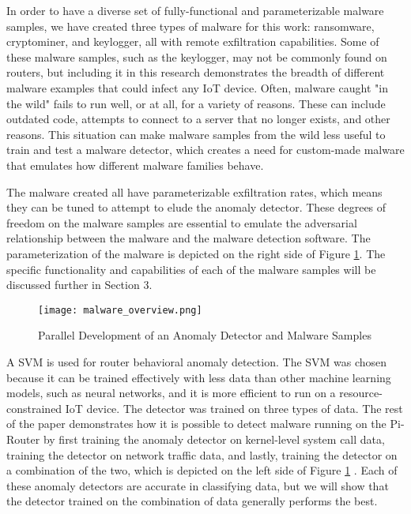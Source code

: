 \documentclass[runningheads]{llncs}
\begin{document}
\indent In order to have a diverse set of fully-functional and parameterizable malware samples, we have created three types of malware for this work: ransomware, cryptominer, and keylogger, all with remote exfiltration capabilities. Some of these malware samples, such as the keylogger, may not be commonly found on routers, but including it in this research demonstrates the breadth of different malware examples that could infect any IoT device. Often, malware caught "in the wild" fails to run well, or at all, for a variety of reasons. These can include outdated code, attempts to connect to a server that no longer exists, and other reasons. This situation can make malware samples from the wild less useful to train and test a malware detector, which creates a need for custom-made malware that emulates how different malware families behave.

\indent The malware created all have parameterizable exfiltration rates, which means they can be tuned to attempt to elude the anomaly detector. These degrees of freedom on the malware samples are essential to emulate the adversarial relationship between the malware and the malware detection software. The parameterization of the malware is depicted on the right side of Figure \ref{fig:overview}. The specific functionality and capabilities of each of the malware samples will be discussed further in Section 3.

\begin{figure}
    \centering
    \texttt{[image: malware\_overview.png]}
    \caption{Parallel Development of an Anomaly Detector and Malware Samples\label{fig:overview}}
\end{figure}

\indent A SVM is used for router behavioral anomaly detection. The SVM was chosen because it can be trained effectively with less data than other machine learning models, such as neural networks, and it is more efficient to run on a resource-constrained IoT device. The detector was trained on three types of data. The rest of the paper demonstrates how it is possible to detect malware running on the Pi-Router by first training the anomaly detector on kernel-level system call data, training the detector on network traffic data, and lastly, training the detector on a combination of the two, which is depicted on the left side of Figure \ref{fig:overview} \cite{MALWARE19}. Each of these anomaly detectors are accurate in classifying data, but we will show that the detector trained on the combination of data generally performs the best.
\end{document}
